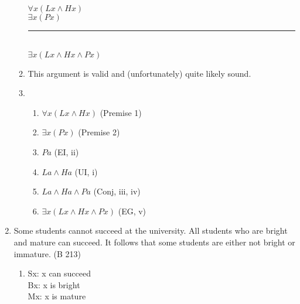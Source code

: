 \documentclass{article}
\begin{document}
\begin{enumerate}
\begin{enumerate}
                        $\forall x(Lx \land Hx)$\\
                        $\exists x(Px)$\\
                        \rule{15em}{.5pt}\\
                        $\exists x(Lx \land Hx \land Px)$
                  \item This argument is valid and (unfortunately) quite likely sound.
                        \setcounter{enumii}{3}
                  \item \begin{enumerate}
                              \item $\forall x(Lx \land Hx)$ (Premise 1)
                              \item $\exists x(Px)$ (Premise 2)
                              \item $Pa$ (EI, ii)
                              \item $La \land Ha$ (UI, i)
                              \item $La \land Ha \land Pa$ (Conj, iii, iv)
                              \item $\exists x(Lx \land Hx \land Px)$ (EG, v)
                        \end{enumerate}
            \end{enumerate}
      \item Some students cannot succeed at the university. All students who are bright and mature can succeed. It follows that some students are either not bright or immature. (B 213)
            \begin{enumerate}
                  \item Sx: x can succeed\\
                        Bx: x is bright\\
                        Mx: x is mature\\


\end{enumerate}
\end{enumerate}
\end{document}
